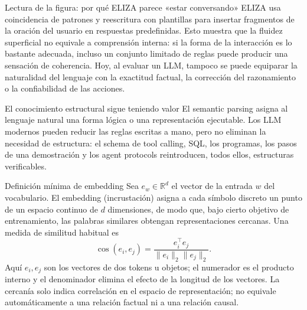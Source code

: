 
\begin{knowledgebox}{Lectura de la figura: por qué ELIZA parece «estar conversando»}
ELIZA usa coincidencia de patrones y reescritura con plantillas para insertar fragmentos de la oración del usuario en respuestas predefinidas. Esto muestra que la fluidez superficial no equivale a comprensión interna: si la forma de la interacción es lo bastante adecuada, incluso un conjunto limitado de reglas puede producir una sensación de coherencia. Hoy, al evaluar un LLM, tampoco se puede equiparar la naturalidad del lenguaje con la exactitud factual, la corrección del razonamiento o la confiabilidad de las acciones.
\end{knowledgebox}


\begin{importantbox}{El conocimiento estructural sigue teniendo valor}
El semantic parsing asigna al lenguaje natural una forma lógica o una representación ejecutable. Los LLM modernos pueden reducir las reglas escritas a mano, pero no eliminan la necesidad de estructura: el schema de tool calling, SQL, los programas, los pasos de una demostración y los agent protocols reintroducen, todos ellos, estructuras verificables.
\end{importantbox}


\begin{importantbox}{Definición mínima de embedding}
Sea $e_w\in\mathbb{R}^{d}$ el vector de la entrada $w$ del vocabulario. El embedding (incrustación) asigna a cada símbolo discreto un punto de un espacio continuo de $d$ dimensiones, de modo que, bajo cierto objetivo de entrenamiento, las palabras similares obtengan representaciones cercanas. Una medida de similitud habitual es
\[
\operatorname{cos}(e_i,e_j)=\frac{e_i^\top e_j}{\lVert e_i\rVert_2\lVert e_j\rVert_2}.
\]
Aquí $e_i,e_j$ son los vectores de dos tokens u objetos; el numerador es el producto interno y el denominador elimina el efecto de la longitud de los vectores. La cercanía solo indica correlación en el espacio de representación; no equivale automáticamente a una relación factual ni a una relación causal.
\end{importantbox}

